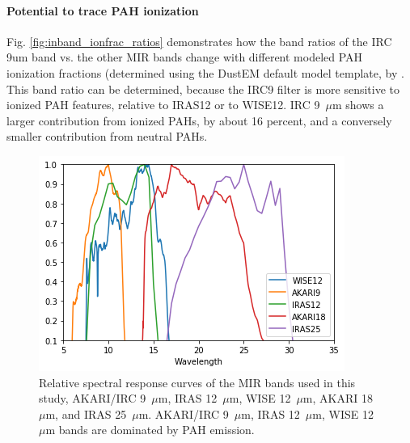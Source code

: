           \paragraph{Potential to trace PAH ionization}
            Fig. \ref{fig:inband_ionfrac_ratios} demonstrates how the band ratios of the IRC 9um band vs. the other MIR bands change with different modeled PAH ionization fractions (determined using the DustEM default model template, by \cite{dustem11}. This band ratio can be determined, because the IRC9 filter is more sensitive to ionized PAH features, relative to IRAS12 or to WISE12.
           IRC 9~$\mu$m shows a larger contribution from ionized PAHs, by about 16 percent, and a conversely smaller contribution from neutral PAHs.

       \begin{figure}
       \label{fig:relSpectralResponse_MIR}
       \centering
       \includegraphics[width=\textwidth]{../Plots/RelSpectralResponse_MIR.png}
       \caption{Relative spectral response curves of the MIR bands used in this study, AKARI/IRC 9~$\mu$m, IRAS 12~$\mu$m, WISE 12~$\mu$m, AKARI 18~$\mu$m, and  IRAS 25~$\mu$m. AKARI/IRC 9~$\mu$m, IRAS 12~$\mu$m, WISE 12~$\mu$m bands are dominated by PAH emission.}
       \end{figure}


